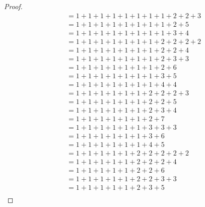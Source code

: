 \begin{proof}
\begin{align*}
           & = 1 + 1 + 1 + 1 + 1 + 1 + 1 + 1 + 2 + 2 + 3                           \\
           & = 1 + 1 + 1 + 1 + 1 + 1 + 1 + 1 + 2 + 5                               \\
           & = 1 + 1 + 1 + 1 + 1 + 1 + 1 + 1 + 3 + 4                               \\
           & = 1 + 1 + 1 + 1 + 1 + 1 + 1 + 2 + 2 + 2 + 2                           \\
           & = 1 + 1 + 1 + 1 + 1 + 1 + 1 + 2 + 2 + 4                               \\
           & = 1 + 1 + 1 + 1 + 1 + 1 + 1 + 2 + 3 + 3                               \\
           & = 1 + 1 + 1 + 1 + 1 + 1 + 1 + 2 + 6                                   \\
           & = 1 + 1 + 1 + 1 + 1 + 1 + 1 + 3 + 5                                   \\
           & = 1 + 1 + 1 + 1 + 1 + 1 + 1 + 4 + 4                                   \\
           & = 1 + 1 + 1 + 1 + 1 + 1 + 2 + 2 + 2 + 3                               \\
           & = 1 + 1 + 1 + 1 + 1 + 1 + 2 + 2 + 5                                   \\
           & = 1 + 1 + 1 + 1 + 1 + 1 + 2 + 3 + 4                                   \\
           & = 1 + 1 + 1 + 1 + 1 + 1 + 2 + 7                                       \\
           & = 1 + 1 + 1 + 1 + 1 + 1 + 3 + 3 + 3                                   \\
           & = 1 + 1 + 1 + 1 + 1 + 1 + 3 + 6                                       \\
           & = 1 + 1 + 1 + 1 + 1 + 1 + 4 + 5                                       \\
           & = 1 + 1 + 1 + 1 + 1 + 2 + 2 + 2 + 2 + 2                               \\
           & = 1 + 1 + 1 + 1 + 1 + 2 + 2 + 2 + 4                                   \\
           & = 1 + 1 + 1 + 1 + 1 + 2 + 2 + 6                                       \\
           & = 1 + 1 + 1 + 1 + 1 + 2 + 2 + 3 + 3                                   \\
           & = 1 + 1 + 1 + 1 + 1 + 2 + 3 + 5                                       \\

\end{align*}
\end{proof}
